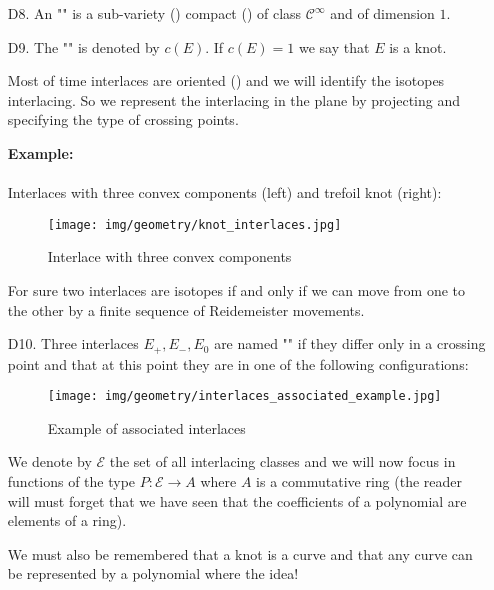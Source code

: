 {\begin{enumerate}
		\item[D8.] An "" is a sub-variety () compact () of class $\mathcal{C}^\infty$ and of dimension $1$.
		
		\item[D9.] The "" is denoted by $c(E)$. If $c(E)=1$ we say that $E$ is a knot.
		
		Most of time interlaces are oriented () and we will identify the isotopes interlacing. So we represent the interlacing in the plane by projecting and specifying the type of crossing points.
		
		\begin{tcolorbox}[colframe=black,colback=white,sharp corners]
		\textbf{{\Large {}}Example:}\\\\
		Interlaces with three convex components (left) and trefoil knot (right):
		\begin{figure}[H]
			\centering
			\texttt{[image: img/geometry/knot\_interlaces.jpg]}
			\caption{Interlace with three convex components}
		\end{figure}
		\end{tcolorbox}
		For sure two interlaces are isotopes if and only if we can move from one to the other by a finite sequence of Reidemeister movements.
		
		\item[D10.] Three interlaces $E_+,E_{-},E_0$ are named "" if they differ only in a crossing point and that at this point they are in one of the following configurations:
		\begin{figure}[H]
			\centering
			\texttt{[image: img/geometry/interlaces\_associated\_example.jpg]}
			\caption{Example of associated interlaces}
		\end{figure}
		We denote by $\mathcal{E}$ the set of all interlacing classes and we will now focus in functions of the type $P:\mathcal{E}\rightarrow A$ where $A$ is a commutative ring (the reader will must forget that we have seen that the coefficients of a polynomial are elements of a ring).
		
		\begin{tcolorbox}[title=Remark,colframe=black,arc=10pt]
		We must also be remembered that a knot is a curve and that any curve can be represented by a polynomial where the idea!
		\end{tcolorbox}
		

\end{enumerate}}
